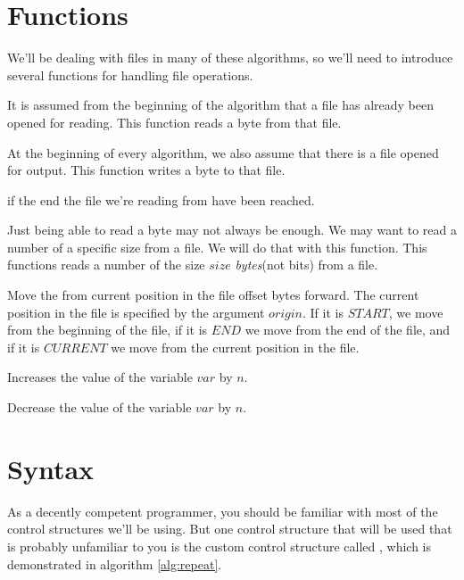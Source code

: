 \section{Functions}
\label{sec:pseudocode}

We'll be dealing with files in many of these algorithms, so we'll need
to introduce several functions for handling file operations.

\begin{description}[font=\normalfont]
\item[\textproc{ReadByte}] It is assumed from the beginning of the
  algorithm that a file has already been opened for reading. This
  function reads a byte from that file.

\item[\Call{WriteByte}{$byte$}] At the beginning of every algorithm,
  we also assume that there is a file opened for output. This function
  writes a byte to that file.

\item[\textproc{EndOfFileReached}] \True{} if the end the file we're
  reading from have been reached.

\item[\Call{Read}{$size$}] Just being able to read a byte may not
  always be enough. We may want to read a number of a specific size
  from a file. We will do that with this function. This functions
  reads a number of the size $size$ \textit{bytes}(not bits) from a
  file.

\item[\Call{Seek}{$offset,origin$}] Move the from current position in
  the file offset bytes forward. The current position in the file is
  specified by the argument $origin$. If it is $START$, we move from the
  beginning of the file, if it is $END$ we move from the end of the
  file, and if it is $CURRENT$ we move from the current position in
  the file.

\item[\Call{Inc}{\ensuremath{var,n}}] Increases the value of the
  variable $var$ by $n$.

\item[\Call{Dec}{\ensuremath{var,n}}] Decrease the value of the
  variable $var$ by $n$.
\end{description}

\section{Syntax}

As a decently competent programmer, you should be familiar with most
of the control structures we'll be using. But one control structure
that will be used that is probably unfamiliar to you is the custom
control structure called \algorithmicrepeat{}, which is demonstrated in algorithm \ref{alg:repeat}.

